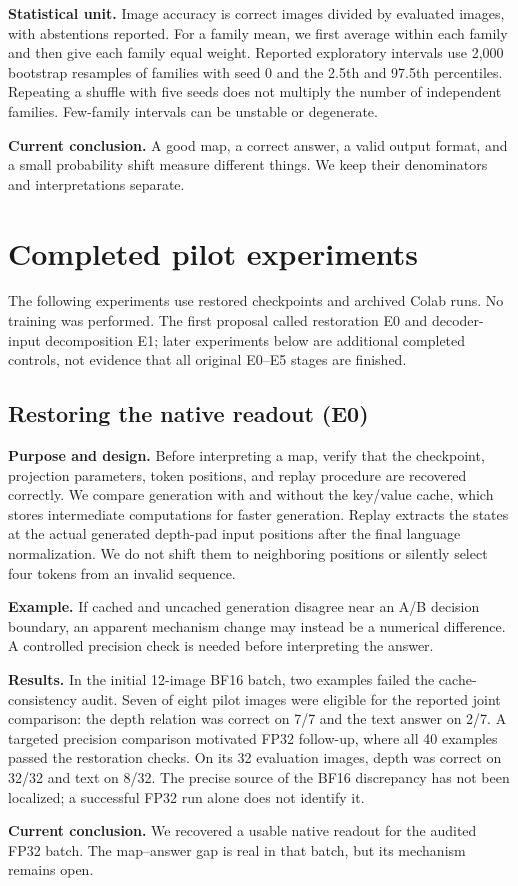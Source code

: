 \documentclass[11pt]{article}
\newcommand{\takeaway}[1]{\par\noindent\textbf{Current conclusion.} #1\par}
\begin{document}
\textbf{Statistical unit.} Image accuracy is correct images divided by evaluated images, with abstentions reported. For a family mean, we first average within each family and then give each family equal weight. Reported exploratory intervals use 2,000 bootstrap resamples of families with seed 0 and the 2.5th and 97.5th percentiles. Repeating a shuffle with five seeds does not multiply the number of independent families. Few-family intervals can be unstable or degenerate.
\takeaway{A good map, a correct answer, a valid output format, and a small probability shift measure different things. We keep their denominators and interpretations separate.}

\section{Completed pilot experiments}
The following experiments use restored checkpoints and archived Colab runs. No training was performed. The first proposal called restoration E0 and decoder-input decomposition E1; later experiments below are additional completed controls, not evidence that all original E0--E5 stages are finished.

\subsection{Restoring the native readout (E0)}
\textbf{Purpose and design.} Before interpreting a map, verify that the checkpoint, projection parameters, token positions, and replay procedure are recovered correctly. We compare generation with and without the key/value cache, which stores intermediate computations for faster generation. Replay extracts the states at the actual generated depth-pad input positions after the final language normalization. We do not shift them to neighboring positions or silently select four tokens from an invalid sequence.

\textbf{Example.} If cached and uncached generation disagree near an A/B decision boundary, an apparent mechanism change may instead be a numerical difference. A controlled precision check is needed before interpreting the answer.

\textbf{Results.} In the initial 12-image BF16 batch, two examples failed the cache-consistency audit. Seven of eight pilot images were eligible for the reported joint comparison: the depth relation was correct on 7/7 and the text answer on 2/7. A targeted precision comparison motivated FP32 follow-up, where all 40 examples passed the restoration checks. On its 32 evaluation images, depth was correct on 32/32 and text on 8/32. The precise source of the BF16 discrepancy has not been localized; a successful FP32 run alone does not identify it.
\takeaway{We recovered a usable native readout for the audited FP32 batch. The map--answer gap is real in that batch, but its mechanism remains open.}
\end{document}
